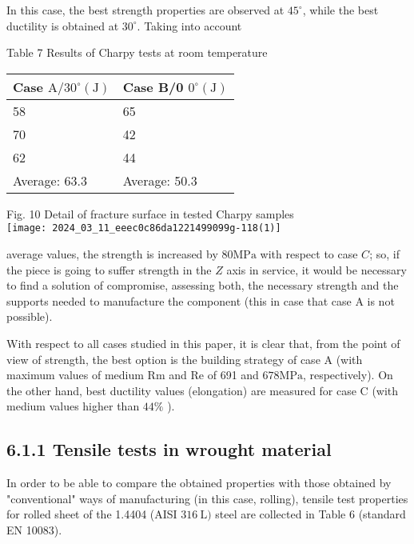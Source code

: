 \documentclass[10pt]{article}
\begin{document}
In this case, the best strength properties are observed at $45^{\circ}$, while the best ductility is obtained at $30^{\circ}$. Taking into account

Table 7 Results of Charpy tests at room temperature

\begin{center}
\begin{tabular}{ll}
\hline
Case $\mathrm{A} / 30^{\circ}(\mathrm{J})$ & Case B/0 $0^{\circ}(\mathrm{J})$ \\
\hline
58 & 65 \\
70 & 42 \\
62 & 44 \\
Average: 63.3 & Average: 50.3 \\
\hline
\end{tabular}
\end{center}

Fig. 10 Detail of fracture surface in tested Charpy samples\\
\texttt{[image: 2024\_03\_11\_eeec0c86da1221499099g-118(1)]}

average values, the strength is increased by $80 \mathrm{MPa}$ with respect to case $C$; so, if the piece is going to suffer strength in the $Z$ axis in service, it would be necessary to find a solution of compromise, assessing both, the necessary strength and the supports needed to manufacture the component (this in case that case $\mathrm{A}$ is not possible).

With respect to all cases studied in this paper, it is clear that, from the point of view of strength, the best option is the building strategy of case $\mathrm{A}$ (with maximum values of medium $\mathrm{Rm}$ and $\mathrm{Re}$ of 691 and $678 \mathrm{MPa}$, respectively). On the other hand, best ductility values (elongation) are measured for case C (with medium values higher than $44 \%$ ).

\subsection*{6.1.1 Tensile tests in wrought material}
In order to be able to compare the obtained properties with those obtained by "conventional" ways of manufacturing (in this case, rolling), tensile test properties for rolled sheet of the 1.4404 (AISI $316 \mathrm{~L})$ steel are collected in Table 6 (standard EN 10083).
\end{document}
